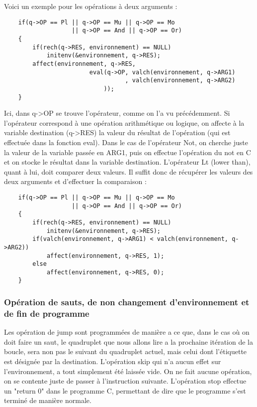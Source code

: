 \documentclass{article}
\begin{document}
Voici un exemple pour les opérations à deux arguments :

\begin{lstlisting}
    if(q->OP == Pl || q->OP == Mu || q->OP == Mo
                   || q->OP == And || q->OP == Or)
    {
        if(rech(q->RES, environnement) == NULL)
            initenv(&environnement, q->RES);
        affect(environnement, q->RES,
                        eval(q->OP, valch(environnement, q->ARG1)
                                  , valch(environnement, q->ARG2)
                            ));
    }
\end{lstlisting}

Ici, dans q->OP se trouve l'opérateur, comme on l'a vu précédemment. Si l'opérateur correspond à une opération arithmétique ou logique, on affecte à la variable destination (q->RES) la valeur du résultat de l'opération (qui est effectuée dans la fonction eval).
\medbreak
Dans le cas de l'opérateur Not, on cherche juste la valeur de la variable passée en ARG1, puis on effectue l'opération du not en C et on stocke le résultat dans la variable destination.
\medbreak
L’opérateur Lt (lower than), quant à lui, doit comparer deux valeurs. Il suffit donc de récupérer les valeurs des deux arguments et d'effectuer la comparaison :

\begin{lstlisting}
    if(q->OP == Pl || q->OP == Mu || q->OP == Mo
                   || q->OP == And || q->OP == Or)
    {
        if(rech(q->RES, environnement) == NULL)
            initenv(&environnement, q->RES);
        if(valch(environnement, q->ARG1) < valch(environnement, q->ARG2))
            affect(environnement, q->RES, 1);
        else
            affect(environnement, q->RES, 0);
    }
\end{lstlisting}


\subsubsection{Opération de sauts, de non changement d'environnement et de fin de programme}

Les opération de jump sont programmées de manière a ce que, dans le cas où on doit faire un saut, le quadruplet que nous allons lire a la prochaine itération de la boucle, sera non pas le suivant du quadruplet actuel, mais celui dont l'étiquette est désignée par la destination.
\medbreak
L'opération skip qui n'a aucun effet sur l'environnement, a tout simplement été laissée vide. On ne fait aucune opération, on se contente juste de passer à l'instruction suivante.
\medbreak
L'opération stop effectue un "return 0" dans le programme C, permettant de dire que le programme s'est terminé de manière normale.
\end{document}
